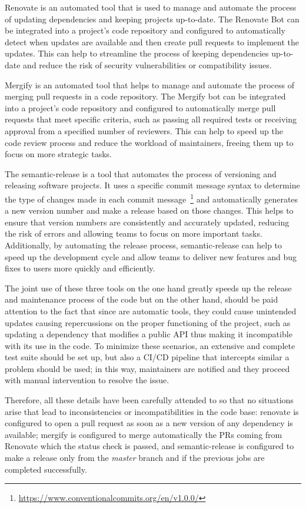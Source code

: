 Renovate is an automated tool that is used to manage and automate the process of updating
dependencies and keeping projects up-to-date. The Renovate Bot can be integrated into a project's code repository and configured to automatically
detect when updates are available and then create pull requests to implement the updates. This can help to streamline the process of keeping
dependencies up-to-date and reduce the risk of security vulnerabilities or compatibility issues.

Mergify is an automated tool that helps to manage and automate the process of merging pull requests in a code repository. The Mergify bot
can be integrated into a project's code repository and configured to automatically merge pull requests that meet specific criteria, such as passing
all required tests or receiving approval from a specified number of reviewers. This can help to speed up the code review process and reduce the
workload of maintainers, freeing them up to focus on more strategic tasks.

The semantic-release is a tool that automates the process of versioning and releasing software projects. It uses a specific commit message syntax to
determine the type of changes made in each commit message~\footnote{\url{https://www.conventionalcommits.org/en/v1.0.0/}} and automatically generates a new version number and make a
release based on those changes.
This helps to ensure that version numbers are consistently and accurately updated, reducing the risk of errors and allowing teams to
focus on more important tasks. Additionally, by automating the release process, semantic-release can help to speed up the development cycle and allow
teams to deliver new features and bug fixes to users more quickly and efficiently.

The joint use of these three tools on the one hand greatly speeds up the release and maintenance process of the code but on the other hand, should be
paid attention to the fact that since are automatic tools, they could cause unintended updates causing repercussions on the proper functioning of the
project, such as updating a dependency that modifies a public API thus making it incompatible with its use in the code. To minimize these scenarios,
an extensive and complete test suite should be set up, but also a CI/CD pipeline that intercepts similar a problem should be used; in this
way, maintainers are notified and they proceed with manual intervention to resolve the issue.

Therefore, all these details have been carefully attended to so that no situations arise that lead to inconsistencies or
incompatibilities in the code base: renovate is configured to open a pull request as soon as a new version of any dependency is available; mergify is
configured to merge automatically the PRs coming from Renovate which the status check is passed, and semantic-release is configured to make a
release only from the \emph{master} branch and if the previous jobs are completed successfully.

